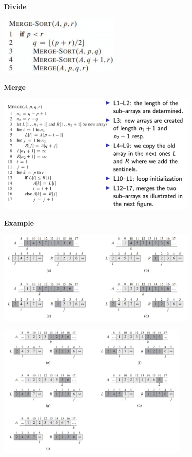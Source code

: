\documentclass[10pt,a4paper,twocolumn]{article}
\begin{document}
\textbf{Divide}
\begin{center}
	\includegraphics[width=6cm]{images/merge-sort-divide}
\end{center}

\textbf{Merge}
\begin{center}
	\includegraphics[width=10cm]{images/merge-sort-merge}
\end{center}

\textbf{Example}
\begin{center}
	\includegraphics[width=10cm]{images/mergesort-example1}
\end{center}

\begin{center}
	\includegraphics[width=9.5cm]{images/mergesort-example2}
\end{center}
\end{document}
